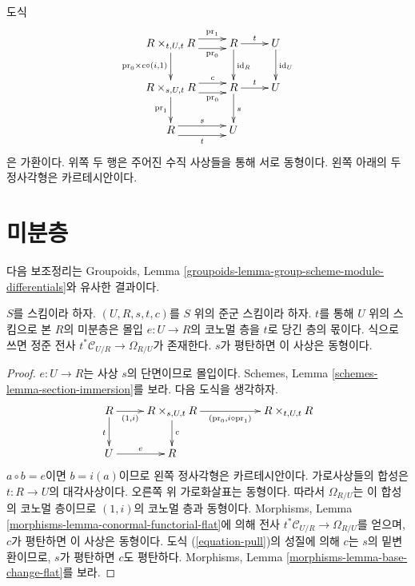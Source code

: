 \medskip\noindent
도식
\begin{equation}
\label{equation-pull}
\vcenter{
\xymatrix{
R \times_{t, U, t} R
\ar@<1ex>[r]^-{\text{pr}_1} \ar@<-1ex>[r]_-{\text{pr}_0}
\ar[d]_{\text{pr}_0 \times c \circ (i, 1)} &
R \ar[r]^t \ar[d]^{\text{id}_R} &
U \ar[d]^{\text{id}_U} \\
R \times_{s, U, t} R
\ar@<1ex>[r]^-c \ar@<-1ex>[r]_-{\text{pr}_0} \ar[d]_{\text{pr}_1} &
R \ar[r]^t \ar[d]^s &
U \\
R \ar@<1ex>[r]^s \ar@<-1ex>[r]_t &
U
}
}
\end{equation}
은 가환이다. 위쪽 두 행은 주어진 수직 사상들을 통해 서로 동형이다.
왼쪽 아래의 두 정사각형은 카르테시안이다.





\section{미분층}
\label{section-differentials}

\noindent
다음 보조정리는 Groupoids, Lemma
\ref{groupoids-lemma-group-scheme-module-differentials}와 유사한 결과이다.

\begin{lemma}
\label{lemma-sheaf-differentials}
$S$를 스킴이라 하자.
$(U, R, s, t, c)$를 $S$ 위의 준군 스킴이라 하자.
$t$를 통해 $U$ 위의 스킴으로 본 $R$의 미분층은 몰입
$e : U \to R$의 코노멀 층을 $t$로 당긴 층의 몫이다. 식으로 쓰면
정준 전사 $t^*\mathcal{C}_{U/R} \to \Omega_{R/U}$가 존재한다.
$s$가 평탄하면 이 사상은 동형이다.
\end{lemma}

\begin{proof}
$e : U \to R$는 사상 $s$의 단면이므로 몰입이다. Schemes, Lemma
\ref{schemes-lemma-section-immersion}를 보라.
다음 도식을 생각하자.
$$
\xymatrix{
R \ar[r]_-{(1, i)} \ar[d]_t &
R \times_{s, U, t} R \ar[d]^c \ar[rr]_{(\text{pr}_0, i \circ \text{pr}_1)} & &
R \times_{t, U, t} R \\
U \ar[r]^e &
R
}
$$
$a \circ b = e$이면 $b = i(a)$이므로 왼쪽 정사각형은 카르테시안이다.
가로사상들의 합성은 $t : R \to U$의 대각사상이다. 오른쪽 위 가로화살표는
동형이다. 따라서 $\Omega_{R/U}$는 이 합성의 코노멀 층이므로
$(1, i)$의 코노멀 층과 동형이다. Morphisms, Lemma
\ref{morphisms-lemma-conormal-functorial-flat}에 의해 전사
$t^*\mathcal{C}_{U/R} \to \Omega_{R/U}$를 얻으며, $c$가 평탄하면
이 사상은 동형이다. 도식 (\ref{equation-pull})의 성질에 의해 $c$는
$s$의 밑변환이므로, $s$가 평탄하면 $c$도 평탄하다. Morphisms, Lemma
\ref{morphisms-lemma-base-change-flat}를 보라.
\end{proof}






